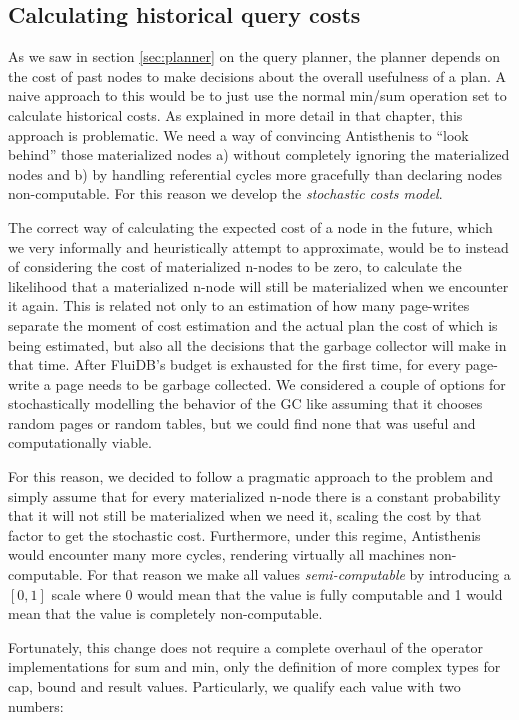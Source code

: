 \subsection{Calculating historical query costs}
\label{sec:historical_cost}

As we saw in section \ref{sec:planner} on the query planner, the
planner depends on the cost of past nodes to make decisions about the
overall usefulness of a plan. A naive approach to this would be to
just use the normal min/sum operation set to calculate historical
costs. As explained in more detail in that chapter, this approach is
problematic. We need a way of convincing Antisthenis to ``look
behind'' those materialized nodes a) without completely ignoring the
materialized nodes and b) by handling referential cycles more
gracefully than declaring nodes non-computable. For this reason we
develop the \emph{stochastic costs model}.

The correct way of calculating the expected cost of a node in the
future, which we very informally and heuristically attempt to
approximate, would be to instead of considering the cost of
materialized n-nodes to be zero, to calculate the likelihood that a
materialized n-node will still be materialized when we encounter it
again. This is related not only to an estimation of how many
page-writes separate the moment of cost estimation and the actual plan
the cost of which is being estimated, but also all the decisions that
the garbage collector will make in that time. After FluiDB's budget is
exhausted for the first time, for every page-write a page needs
to be garbage collected. We considered a couple of options for
stochastically modelling the behavior of the GC like assuming that it
chooses random pages or random tables, but we could find none that was
useful and computationally viable.

For this reason, we decided to follow a pragmatic approach to the
problem and simply assume that for every materialized n-node there is a
constant probability that it will not still be materialized when we
need it, scaling the cost by that factor to get the stochastic
cost. Furthermore, under this regime, Antisthenis would encounter many
more cycles, rendering virtually all machines non-computable. For that
reason we make all values \emph{semi-computable} by introducing a \([0,1]\)
scale where 0 would mean that the value is fully computable and 1
would mean that the value is completely non-computable.

Fortunately, this change does not require a complete overhaul of the
operator implementations for sum and min, only the definition of more complex types
for cap, bound and result values. Particularly, we qualify each value
with two numbers:

